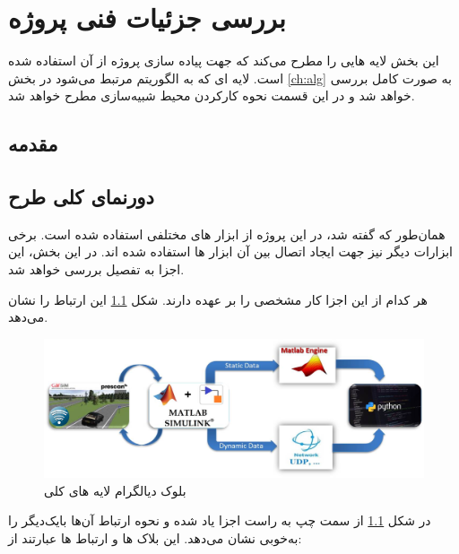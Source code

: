 \chapter{بررسی جزئیات فنی پروژه}\label{ch:fani}

این بخش لایه هایی را مطرح می‌کند که جهت پیاده سازی پروژه از آن استفاده شده است. لایه ای که به الگوریتم مرتبط می‌شود در بخش \ref{ch:alg} به صورت کامل بررسی خواهد شد و در این قسمت نحوه کارکردن محیط شبیه‌سازی مطرح خواهد شد.



\section{مقدمه}
\section{دورنمای کلی طرح}
همان‌طور که گفته شد، در این پروژه از ابزار های مختلفی استفاده شده است. برخی ابزارات دیگر نیز جهت ایجاد اتصال بین آن ابزار ها استفاده شده اند. در این بخش، این اجزا به تفصیل بررسی خواهد شد.

هر کدام از این اجزا کار مشخصی را بر عهده دارند.
شکل  
\ref{fig:block-diagram}
این ارتباط را نشان می‌دهد.

\begin{figure}[h!]
	\centering
	\includegraphics[width=1\linewidth]{Figures/block-diagram-white}
	\caption{بلوک دیالگرام لایه های کلی}
	\label{fig:block-diagram}
\end{figure}

در شکل 
\ref{fig:block-diagram}
از سمت چپ به راست اجزا یاد شده و نحوه ارتباط آن‌ها با‌یک‌دیگر را به‌خوبی نشان می‌دهد. این بلاک ها و ارتباط ها عبارتند از:

